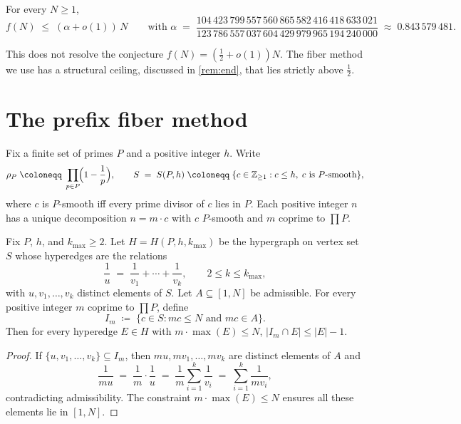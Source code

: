 \documentclass{amsart}
\begin{document}
\begin{theorem}\label{thm:main}
For every $N \geq 1$,
\[
    f(N) \;\leq\; (\alpha + o(1))\, N \qquad
    \text{with } \alpha \;=\; \frac{104\,423\,799\,557\,560\,865\,582\,416\,418\,633\,021}
                                    {123\,786\,557\,037\,604\,429\,979\,965\,194\,240\,000}
    \;\approx\; 0.843\,579\,481.
\]
\end{theorem}

\begin{remark}
This does not resolve the conjecture $f(N) = (\tfrac{1}{2} + o(1)) N$. The
fiber method we use has a structural ceiling, discussed in \cref{rem:end},
that lies strictly above $\tfrac{1}{2}$.
\end{remark}

\section*{The prefix fiber method}

Fix a finite set of primes $P$ and a positive integer $h$. Write
\[
    \rho_P \;\coloneqq\; \prod_{p \in P}\!\Bigl(1 - \frac{1}{p}\Bigr),
    \qquad
    S \;=\; S(P, h) \;\coloneqq\; \{c \in \mathbb{Z}_{\geq 1} : c \leq h,\; c \text{ is } P\text{-smooth}\},
\]
where $c$ is $P$-smooth iff every prime divisor of $c$ lies in $P$. Each
positive integer $n$ has a unique decomposition $n = m \cdot c$ with
$c$ $P$-smooth and $m$ coprime to $\prod P$.

\begin{lemma}\label{lem:fiber}
Fix $P$, $h$, and $k_{\max} \geq 2$. Let $H = H(P, h, k_{\max})$ be the hypergraph on vertex set $S$ whose hyperedges are the relations
\[
    \frac{1}{u} \;=\; \frac{1}{v_1} + \cdots + \frac{1}{v_k}, \qquad 2 \leq k \leq k_{\max},
\]
with $u, v_1, \ldots, v_k$ distinct elements of $S$. Let $A \subseteq [1, N]$
be admissible. For every positive integer $m$ coprime to $\prod P$, define
\[
    I_m \;\coloneqq\; \{c \in S : m c \leq N \text{ and } m c \in A\}.
\]
Then for every hyperedge $E \in H$ with $m \cdot \max(E) \leq N$, $|I_m \cap E| \leq |E| - 1$.
\end{lemma}

\begin{proof}
If $\{u, v_1, \ldots, v_k\} \subseteq I_m$, then $mu, mv_1, \ldots, mv_k$ are distinct elements of $A$ and
\[
    \frac{1}{mu} \;=\; \frac{1}{m} \cdot \frac{1}{u} \;=\; \frac{1}{m} \sum_{i=1}^{k} \frac{1}{v_i} \;=\; \sum_{i=1}^{k} \frac{1}{m v_i},
\]
contradicting admissibility. The constraint $m \cdot \max(E) \leq N$
ensures all these elements lie in $[1, N]$.
\end{proof}
\end{document}
